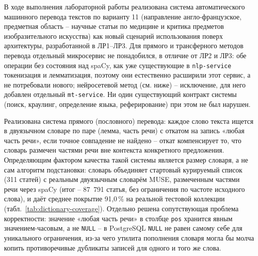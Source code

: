 

В ходе выполнения лабораторной работы реализована система
автоматического машинного перевода текстов по варианту 11
(направление англо-французское, предметная область -- научные статьи
по медицине и критика предметов изобразительного искусства) как новый
сценарий использования поверх архитектуры, разработанной в ЛР1--ЛР3.
Для прямого и трансферного методов перевода отдельный микросервис не
понадобился, в отличие от ЛР2 и ЛР3: обе операции без состояния над
spaCy, как уже существующие в \texttt{nlp-service} токенизация и
лемматизация, поэтому они естественно расширили этот сервис, а не
потребовали нового; нейросетевой метод (см. ниже) -- исключение,
для него добавлен отдельный \texttt{mt-service}. Ни один существующий
контракт системы (поиск, краулинг, определение языка, реферирование)
при этом не был нарушен.

Реализована система прямого (пословного) перевода: каждое слово текста
ищется в двуязычном словаре по паре (лемма, часть речи) с откатом на
запись «любая часть речи», если точное совпадение не найдено -- откат
компенсирует то, что словарь размечен частями речи вне контекста
конкретного предложения. Определяющим фактором качества такой системы
является размер словаря, а не сам алгоритм подстановки: словарь
объединяет стартовый курируемый список (311 статей) с реальным
двуязычным словарём MUSE, размеченным частями речи через spaCy (итог
-- 87~791 статья, без ограничения по частоте исходного слова), и даёт
среднее покрытие 91{,}0\,\% на реальной тестовой коллекции
(табл.~\ref{tab:dictionary-coverage}). Отдельно решена
сопутствующая проблема корректности: значение «любая часть речи» в
столбце \texttt{pos} хранится явным значением-часовым, а не
\texttt{NULL} -- в PostgreSQL \texttt{NULL} не равен самому себе для
уникального ограничения, из-за чего утилита пополнения словаря могла
бы молча копить противоречивые дубликаты записей для одного и того же
слова.

